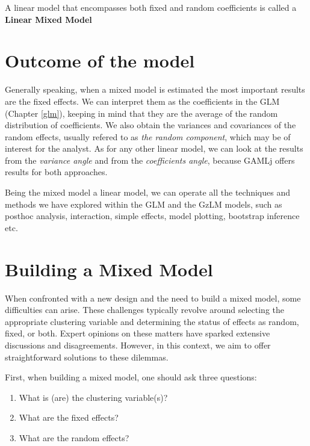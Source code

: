 \documentclass[
]{book}
\providecommand{\tightlist}{%
  \setlength{\itemsep}{0pt}\setlength{\parskip}{0pt}}
\begin{document}
A linear model that encompasses both fixed and random coefficients is called a \textbf{Linear Mixed Model}

\hypertarget{outcome-of-the-model}{%
\section{Outcome of the model}\label{outcome-of-the-model}}

Generally speaking, when a mixed model is estimated the most important results are the fixed effects. We can interpret them as the coefficients in the GLM (Chapter \ref{glm}), keeping in mind that they are the average of the random distribution of coefficients. We also obtain the variances and covariances of the random effects, usually refered to as \emph{the random component}, which may be of interest for the analyst. As for any other linear model, we can look at the results from the \emph{variance angle} and from the \emph{coefficients angle}, because {GAMLj} offers results for both approaches.

Being the mixed model a linear model, we can operate all the techniques and methods we have explored within the GLM and the GzLM models, such as posthoc analysis, interaction, simple effects, model plotting, bootstrap inference etc.

\hypertarget{building-a-mixed-model}{%
\section{Building a Mixed Model}\label{building-a-mixed-model}}

When confronted with a new design and the need to build a mixed model, some difficulties can arise. These challenges typically revolve around selecting the appropriate clustering variable and determining the status of effects as random, fixed, or both. Expert opinions on these matters have sparked extensive discussions and disagreements. However, in this context, we aim to offer straightforward solutions to these dilemmas.

First, when building a mixed model, one should ask three questions:

\begin{enumerate}
\def\labelenumi{\arabic{enumi})}
\tightlist
\item
  What is (are) the clustering variable(s)?
\item
  What are the fixed effects?
\item
  What are the random effects?
\end{enumerate}
\end{document}

